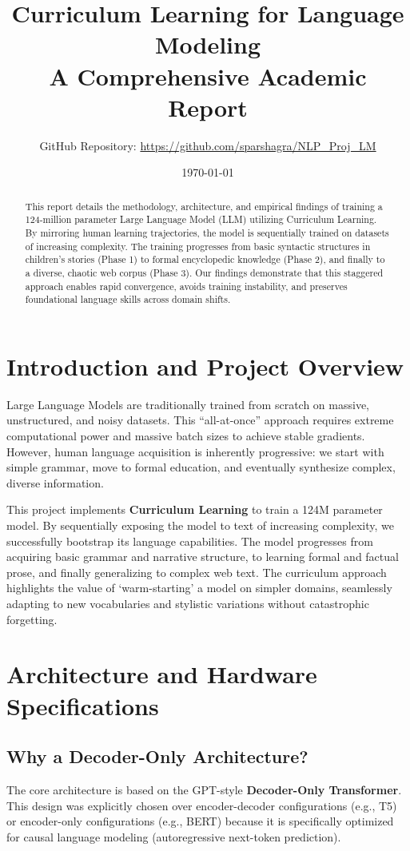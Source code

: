 \documentclass[12pt]{article}
\title{Curriculum Learning for Language Modeling\\ 
\large A Comprehensive Academic Report}
\author{GitHub Repository: \url{https://github.com/sparshagra/NLP_Proj_LM}}
\date{\today}
\begin{document}
\maketitle

\begin{abstract}
This report details the methodology, architecture, and empirical findings of training a 124-million parameter Large Language Model (LLM) utilizing Curriculum Learning. By mirroring human learning trajectories, the model is sequentially trained on datasets of increasing complexity. The training progresses from basic syntactic structures in children's stories (Phase 1) to formal encyclopedic knowledge (Phase 2), and finally to a diverse, chaotic web corpus (Phase 3). Our findings demonstrate that this staggered approach enables rapid convergence, avoids training instability, and preserves foundational language skills across domain shifts.
\end{abstract}

\vspace{1cm}

\section{Introduction and Project Overview}
Large Language Models are traditionally trained from scratch on massive, unstructured, and noisy datasets. This ``all-at-once'' approach requires extreme computational power and massive batch sizes to achieve stable gradients. However, human language acquisition is inherently progressive: we start with simple grammar, move to formal education, and eventually synthesize complex, diverse information.

This project implements \textbf{Curriculum Learning} to train a 124M parameter model. By sequentially exposing the model to text of increasing complexity, we successfully bootstrap its language capabilities. The model progresses from acquiring basic grammar and narrative structure, to learning formal and factual prose, and finally generalizing to complex web text. The curriculum approach highlights the value of `warm-starting' a model on simpler domains, seamlessly adapting to new vocabularies and stylistic variations without catastrophic forgetting.

\section{Architecture and Hardware Specifications}
\subsection{Why a Decoder-Only Architecture?}
The core architecture is based on the GPT-style \textbf{Decoder-Only Transformer}. This design was explicitly chosen over encoder-decoder configurations (e.g., T5) or encoder-only configurations (e.g., BERT) because it is specifically optimized for causal language modeling (autoregressive next-token prediction). 
\end{document}
